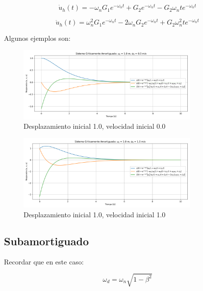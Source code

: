 \documentclass{article}  %
\begin{document}
\begin{equation}
    \dot{u}_h(t) = -\omega_n G_1e^{-\omega_n t} + G_2e^{-\omega_n t} - G_2\omega_n te^{-\omega_n t}
\end{equation}

\begin{equation}
    \ddot{u}_h(t) = \omega_n^2 G_1e^{-\omega_n t} - 2\omega_n G_2e^{-\omega_n t} + G_2\omega_n^2 te^{-\omega_n t}
\end{equation}

Algunos ejemplos son:
\begin{figure}[H]
    \centering
    \includegraphics[width=0.8\textwidth]{GRAFICOS/sis_criticamente_amortiguado_u0_1.0_v0_0.0.png}
    \caption{Desplazamiento inicial 1.0, velocidad inicial 0.0}
    \label{fig:ejemplo1}
\end{figure}

\begin{figure}[H]
    \centering
    \includegraphics[width=0.8\textwidth]{GRAFICOS/sis_criticamente_amortiguado_u0_1.0_v0_1.0.png}
    \caption{Desplazamiento inicial 1.0, velocidad inicial 1.0}
    \label{fig:ejemplo1}
\end{figure}

\subsection{Subamortiguado}

Recordar que en este caso:

\begin{equation}
    \omega_d = \omega_n \sqrt{1 - \beta^2}
\end{equation}
\end{document}
